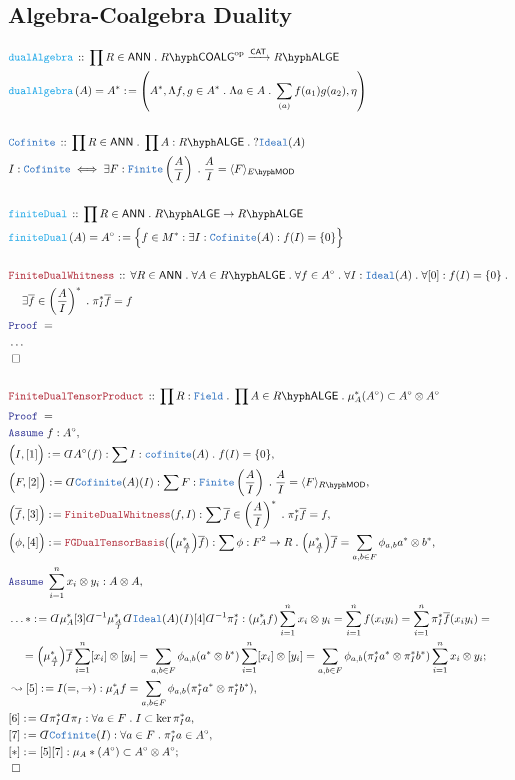 \documentclass[12pt]{scrartcl}%
\newcommand{\TYPE}[1]{\textcolor{NavyBlue}{\mathtt{#1}}}%
\newcommand{\FUNC}[1]{\textcolor{Cerulean}{\mathtt{#1}}}%
\newcommand{\LOGIC}[1]{\textcolor{Blue}{\mathtt{#1}}}%
\newcommand{\THM}[1]{\textcolor{Maroon}{\mathtt{#1}}}%
\renewcommand{\.}{\; . \;} %
\newcommand{\de}{: \kern 0.1pc =} %
\newcommand{\Act}[1]{\left( #1 \right)} %
\newcommand{\Theorem}[2]{& \THM{#1} \, :: \, #2 \\ & \Proof = \\ } %
\newcommand{\DeclareType}[2]{& \TYPE{#1} \, :: \, #2 \\}%
\newcommand{\DefineType}[3]{& #1 : \TYPE{#2} \iff #3 \\}%
\newcommand{\DeclareFunc}[2]{& \FUNC{#1} \, :: \, #2 \\}%
\newcommand{\DefineNamedFunc}[4]{&  \FUNC{#1}\Act{#2} = #3 \de #4 \\}%
\newcommand{\NewLine}{\\ & \kern 1pc}%
\newcommand{\Page}[1]{ \begin{align*} #1 \end{align*}  }%
\newcommand{ \bd }{ \ByDef }%
\newcommand{\NoProof}{ & \ldots \\ \EndProof}%
\newcommand{\Say}[3]{& #1 \de #2 : #3, \\} %
\newcommand{\Conclude}[3]{& #1 \de #2 : #3; \\}%
\newcommand{\Derive}[3]{& \leadsto #1 \de #2 : #3, \\} %
\newcommand{\Assume}[2]{& \LOGIC{Assume} \; #1 : #2, \\} %
\newcommand{\QED}{\; \square} %
\newcommand{\EndProof}{& \QED \\} %
\newcommand{\ByDef}{\rotatebox[origin=c]{-180}{$D$}}%
\newcommand{\Proof}{\LOGIC{Proof} \; } %
\newcommand{\Arrow}[1]{\xrightarrow{#1}}%
\newcommand{\CAT}{\mathsf{CAT}} %
\newcommand{\LMOD}[1]{#1\hyph\mathsf{MOD}} %
\newcommand{\Ideal}{\TYPE{Ideal}}
\newcommand{\ANN}{\mathsf{ANN}} %
\newcommand{\LALGE}[1]{#1\hyph\mathsf{ALGE}}%
\newcommand{\COALG}[1]{#1\hyph\mathsf{COALG}}%
\begin{document}
\subsection{Algebra-Coalgebra Duality}
\Page{
	\DeclareFunc{dualAlgebra}{ \prod R \in \ANN \. \COALG{R}^{\mathrm{op}} \Arrow{\CAT} \LALGE{R}}
	\DefineNamedFunc{dualAlgebra}{A}{A^*}{\left( A^*, \Lambda f,g \in A^* \. \Lambda a \in A \. \sum_{(a)} f(a_1)g(a_2), \eta   \right) } 
	\\
	\DeclareType{Cofinite}{\prod R \in \ANN \. \prod A : \LALGE{R} \. ? \TYPE{Ideal}(A) }
	\DefineType{I}{Cofinite}{\exists F : \TYPE{Finite}\left(\frac{A}{I}\right) \. \frac{A}{I} = \langle F \rangle_{\LMOD{E}}}
	\\
	\DeclareFunc{finiteDual}{ \prod R \in \ANN \. \LALGE{R} \to \LALGE{R}}
	\DefineNamedFunc{finiteDual}{A}{A^\circ}{\Big\{ f \in M^* : \exists I : \TYPE{Cofinite}(A)  : f(I) = \{0\} \Big\}}
	\\
	\Theorem{FiniteDualWhitness}{
		\forall R \in \ANN \. 
		\forall A \in \LALGE{R} \. 
		\forall f \in A^\circ \. 
		\forall I : \TYPE{Ideal}(A ) \.
		\forall [0] : f(I) = \{0\} \. \NewLine
		\exists \overline{f} \in \left( \frac{A}{I} \right)^* \.
		\pi^*_I \overline{f} = f
	}
	\NoProof
	\\
	\Theorem{FiniteDualTensorProduct}{ 
		\prod R  : \TYPE{Field} \. 
		\prod A \in \LALGE{R} \.
		\mu_A^*(A^\circ) \subset A^\circ \otimes A^\circ
	}
	\Assume{f}{A^\circ}
	\Say{\Big(I,[1]\Big)}{\bd A^\circ(f)}{\sum I : \TYPE{cofinite}(A) \. f(I) = \{0\}  }
	\Say{\Big(F,[2]\Big)}{\bd \TYPE{Cofinite}(A)(I)}{\sum F : \TYPE{Finite}\left(\frac{A}{I}\right) \. \frac{A}{I} = \langle F \rangle_{\LMOD{R}}  }
	\Say{ \Big( \overline{f},[3] \Big) }{ \THM{FiniteDualWhitness}(f,I) }{ \sum \overline{f} \in \left( \frac{A}{I} \right)^* \. \pi^*_I \overline{f} = f }
	\Say{\Big(\phi,[4]\Big)}{\THM{FGDualTensorBasis}(\Big(\mu_{\frac{A}{I}}^* \Big) \overline{f})}
	{ \sum \phi : F^2 \to R \. \Big(\mu_{\frac{A}{I}}^* \Big) \overline{f} = \sum_{a,b \in F} \phi_{a,b} a^* \otimes b^*}
	\Assume{\sum^n_{i=1} x_i \otimes y_i}{A \otimes A}
	\Conclude{\ldots*}{ \bd \mu_A^* [3] \bd^{-1} \mu_{\frac{A}{I}}^*\bd \Ideal(A)(I) [4] \bd^{-1} \pi^*_I    }
	{ 
	    (\mu_A^* f) \sum^n_{i=1} x_i \otimes y_i = 
	    \sum^n_{i=1} f( x_i y_i ) = 
	    \sum^n_{i=1} \pi^*_I \overline{f}(x_i y_i) = \NewLine =  
	    \Big(\mu_{\frac{A}{I}}^* \Big) \overline{f} \sum^n_{i=1} [x_i] \otimes [y_i] =
	    \sum_{a,b \in F} \phi_{a,b}(a^* \otimes b^*)\sum^n_{i=1}   [x_i] \otimes [y_i] =
	    \sum_{a,b \in F} \phi_{a,b}(\pi^*_I a^* \otimes \pi^*_I b^*) \sum^n_{i=1}  x_i \otimes y_i 
	}
	\Derive{[5]}{I(=,\to)}{ \mu_A^* f = \sum_{a,b \in F} \phi_{a,b} (\pi^*_I a^* \otimes \pi^*_I b^*) }
	\Say{[6]}{\bd \pi^*_I \bd \pi_I}{\forall a \in F \. I \subset \ker \pi^*_I a }
	\Say{[7]}{\bd \TYPE{Cofinite}(I)}{ \forall a \in F \. \pi^*_I a \in A^\circ}
	\Conclude{[*]}{[5][7]}{\mu_A*(A^\circ) \subset A^\circ \otimes A^\circ}
	\EndProof
}
\end{document}
